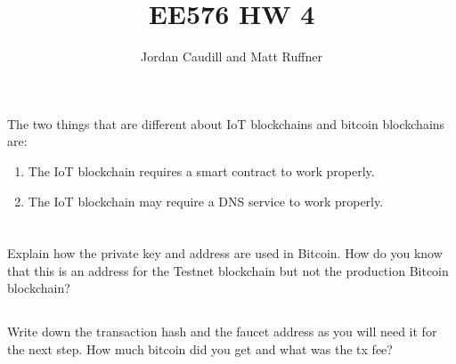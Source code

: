 \documentclass[letterpaper]{article}
\title{EE576 HW 4}
\author{Jordan Caudill and Matt Ruffner}
\begin{document}
\maketitle

\section{}
The two things that are different about IoT blockchains and bitcoin blockchains are:

\begin{enumerate}
    \item The IoT blockchain requires a smart contract to work properly.
    \item The IoT blockchain may require a DNS service to work properly. 
\end{enumerate}



\section{}

\subsection{}
Explain how the private key and address are used in Bitcoin. How do you know that this is an address for the Testnet blockchain but not the production Bitcoin blockchain?

\subsection{}
Write down the transaction hash and the faucet address as you will need it for the next step. How much bitcoin did you get and what was the tx fee?
\end{document}
